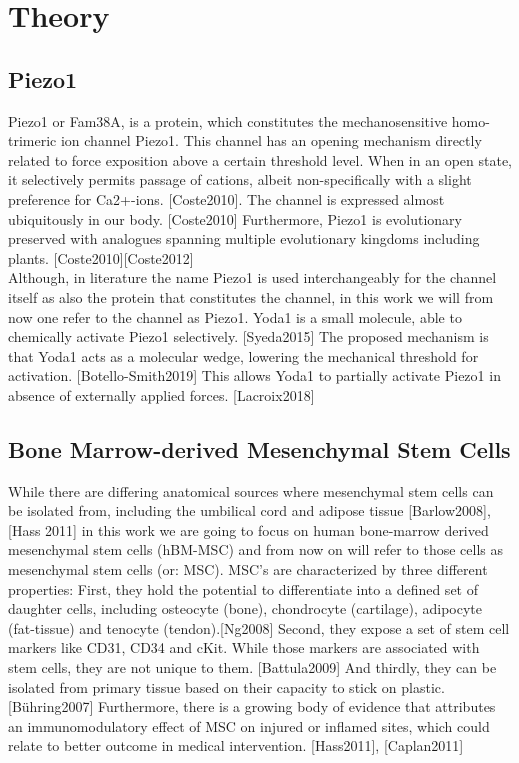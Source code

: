 \section{Theory}

\subsection{Piezo1}


Piezo1 or Fam38A, is a protein, which constitutes the mechanosensitive homo-trimeric ion channel Piezo1. This channel has an opening mechanism directly related to force exposition above a certain threshold level. When in an open state, it selectively permits passage of cations, albeit non-specifically with a slight preference for Ca2+-ions. [Coste2010]. The channel is expressed almost ubiquitously in our body. [Coste2010] Furthermore, Piezo1 is evolutionary preserved with analogues spanning multiple evolutionary kingdoms including plants. [Coste2010][Coste2012]\\
Although, in literature the name Piezo1 is used interchangeably for the channel itself as also the protein that constitutes the channel, in this work we will from now one refer to the channel as Piezo1.
Yoda1 is a small molecule, able to chemically activate Piezo1 selectively. [Syeda2015] The proposed mechanism is that Yoda1 acts as a molecular wedge, lowering the mechanical threshold for activation. [Botello-Smith2019] This allows Yoda1 to partially activate Piezo1 in absence of externally applied forces. [Lacroix2018]

\subsection{Bone Marrow-derived Mesenchymal Stem Cells}
While there are differing anatomical sources where mesenchymal stem cells can be isolated from, including the umbilical cord and adipose tissue [Barlow2008], [Hass 2011] in this work we are going to focus on human bone-marrow derived mesenchymal stem cells (hBM-MSC) and from now on will refer to those cells as mesenchymal stem cells (or: MSC). \hfill \newline 
MSC's are characterized by three different properties: First, they hold the potential to differentiate into a defined set of daughter cells, including osteocyte (bone), chondrocyte (cartilage), adipocyte (fat-tissue) and tenocyte (tendon).[Ng2008] Second, they expose a set of stem cell markers like CD31, CD34 and cKit. While those markers are associated with stem cells, they are not unique to them. [Battula2009] And thirdly, they can be isolated from primary tissue based on their capacity to stick on plastic. [Bühring2007] Furthermore, there is a growing body of evidence that attributes an immunomodulatory effect of MSC on injured or inflamed sites, which could relate to better outcome in medical intervention. [Hass2011], [Caplan2011]

